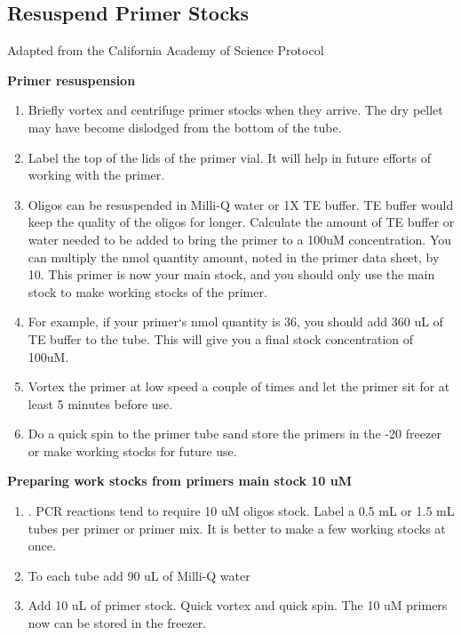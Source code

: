 \documentclass[11pt, oneside]{article}
\begin{document}
\newpage

	\subsection{Resuspend Primer Stocks \label{Resuspend_Primer_Stocks}}

		Adapted from the California Academy of Science Protocol
	
		\vspace{3mm}
	
		{\bf Primer resuspension}	
		
		\begin{enumerate}
			\item Briefly vortex and centrifuge primer stocks when they arrive. The dry pellet may have become dislodged from the bottom of the tube. 
			\item Label the top of the lids of the primer vial. It will help in future efforts of working with the primer. 
			\item Oligos can be resuspended in Milli-Q water or 1X TE buffer. TE buffer would keep the quality of the oligos for longer. Calculate the 				amount of TE buffer or water needed to be added to bring the primer to a 100uM concentration. You can multiply the nmol quantity amount, 			noted in the primer data sheet, by 10. This primer is now your main stock, and you should only use the main stock to make working stocks of 			the primer.
			\item For example, if your primer`s nmol quantity is 36, you should add 360 uL of TE buffer to the tube. This will give you a final stock 				concentration of 100uM.  
			\item Vortex the primer at low speed a couple of times and let the primer sit for at least 5 minutes before use. 
			\item Do a quick spin to the primer tube sand store the primers in the -20 freezer or make working stocks for future use. 
		\end{enumerate}
		
		\vspace{3mm}
		
		{\bf Preparing work stocks from primers main stock 10 uM}
		
		\begin{enumerate}
			\item. PCR reactions tend to require 10 uM oligos stock. Label a 0.5 mL or 1.5 mL tubes per primer or primer mix. It is better to make a few 			working stocks at once. 
			\item To each tube add 90 uL of Milli-Q water
			\item Add 10 uL of primer stock. Quick vortex and quick spin. The 10 uM primers now can be stored in the freezer. 
		\end{enumerate}
		
	\newpage
 
	
	
		
\end{document}
